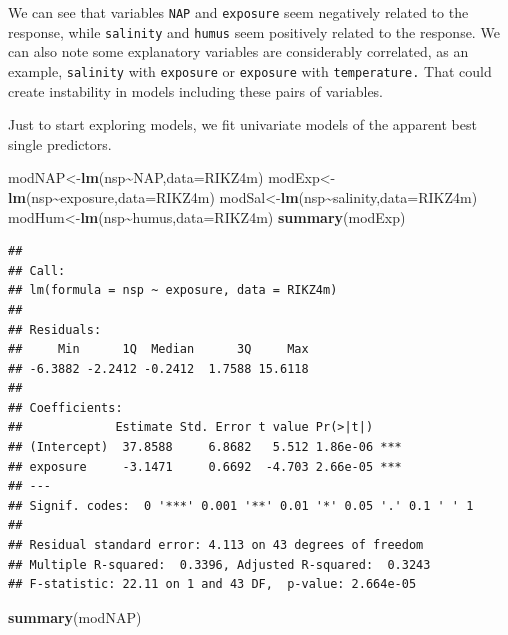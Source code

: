 \documentclass[
]{book}
\newenvironment{Shaded}{\begin{snugshade}}{\end{snugshade}}
\newcommand{\AttributeTok}[1]{\textcolor[rgb]{0.13,0.29,0.53}{#1}}
\newcommand{\FunctionTok}[1]{\textcolor[rgb]{0.13,0.29,0.53}{\textbf{#1}}}
\newcommand{\NormalTok}[1]{#1}
\newcommand{\OtherTok}[1]{\textcolor[rgb]{0.56,0.35,0.01}{#1}}
\newcommand{\SpecialCharTok}[1]{\textcolor[rgb]{0.81,0.36,0.00}{\textbf{#1}}}
\begin{document}
We can see that variables \texttt{NAP} and \texttt{exposure} seem negatively related to the response, while \texttt{salinity} and \texttt{humus} seem positively related to the response. We can also note some explanatory variables are considerably correlated, as an example, \texttt{salinity} with \texttt{exposure} or \texttt{exposure} with \texttt{temperature.} That could create instability in models including these pairs of variables.

Just to start exploring models, we fit univariate models of the apparent best single predictors.

\begin{Shaded}
\begin{Highlighting}[]
\NormalTok{modNAP}\OtherTok{\textless{}{-}}\FunctionTok{lm}\NormalTok{(nsp}\SpecialCharTok{\textasciitilde{}}\NormalTok{NAP,}\AttributeTok{data=}\NormalTok{RIKZ4m)}
\NormalTok{modExp}\OtherTok{\textless{}{-}}\FunctionTok{lm}\NormalTok{(nsp}\SpecialCharTok{\textasciitilde{}}\NormalTok{exposure,}\AttributeTok{data=}\NormalTok{RIKZ4m)}
\NormalTok{modSal}\OtherTok{\textless{}{-}}\FunctionTok{lm}\NormalTok{(nsp}\SpecialCharTok{\textasciitilde{}}\NormalTok{salinity,}\AttributeTok{data=}\NormalTok{RIKZ4m)}
\NormalTok{modHum}\OtherTok{\textless{}{-}}\FunctionTok{lm}\NormalTok{(nsp}\SpecialCharTok{\textasciitilde{}}\NormalTok{humus,}\AttributeTok{data=}\NormalTok{RIKZ4m)}
\FunctionTok{summary}\NormalTok{(modExp)}
\end{Highlighting}
\end{Shaded}

\begin{verbatim}
## 
## Call:
## lm(formula = nsp ~ exposure, data = RIKZ4m)
## 
## Residuals:
##     Min      1Q  Median      3Q     Max 
## -6.3882 -2.2412 -0.2412  1.7588 15.6118 
## 
## Coefficients:
##             Estimate Std. Error t value Pr(>|t|)    
## (Intercept)  37.8588     6.8682   5.512 1.86e-06 ***
## exposure     -3.1471     0.6692  -4.703 2.66e-05 ***
## ---
## Signif. codes:  0 '***' 0.001 '**' 0.01 '*' 0.05 '.' 0.1 ' ' 1
## 
## Residual standard error: 4.113 on 43 degrees of freedom
## Multiple R-squared:  0.3396, Adjusted R-squared:  0.3243 
## F-statistic: 22.11 on 1 and 43 DF,  p-value: 2.664e-05
\end{verbatim}

\begin{Shaded}
\begin{Highlighting}[]
\FunctionTok{summary}\NormalTok{(modNAP)}
\end{Highlighting}
\end{Shaded}
\end{document}
